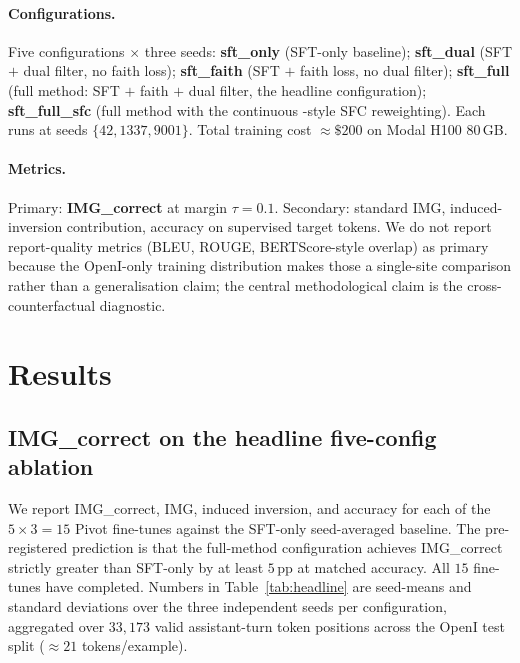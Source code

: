 \documentclass{article}
\begin{document}
\paragraph{Configurations.} Five configurations $\times$ three seeds:
\textbf{sft\_only} (SFT-only baseline); \textbf{sft\_dual} (SFT $+$ dual
filter, no faith loss); \textbf{sft\_faith} (SFT $+$ faith loss, no dual
filter); \textbf{sft\_full} (full method: SFT $+$ faith $+$ dual filter,
the headline configuration); \textbf{sft\_full\_sfc} (full method with the
continuous \citet{li2025sfc}-style SFC reweighting). Each runs at seeds
$\{42, 1337, 9001\}$. Total training cost $\approx \$200$ on Modal H100
80\,GB.

\paragraph{Metrics.} Primary: \textbf{IMG\_correct} at margin $\tau = 0.1$.
Secondary: standard IMG, induced-inversion contribution, accuracy on
supervised target tokens. We do not report report-quality metrics (BLEU,
ROUGE, BERTScore-style overlap) as primary because the OpenI-only training
distribution makes those a single-site comparison rather than a
generalisation claim; the central methodological claim is the cross-
counterfactual diagnostic.

\section{Results}
\label{sec:results}

\subsection{IMG\_correct on the headline five-config ablation}
\label{sec:headline}

We report IMG\_correct, IMG, induced inversion, and accuracy for each of
the $5\times3 = 15$ Pivot fine-tunes against the SFT-only seed-averaged
baseline. The pre-registered prediction is that the full-method
configuration achieves IMG\_correct strictly greater than SFT-only by at
least $5$\,pp at matched accuracy. All $15$ fine-tunes have completed.
Numbers in Table~\ref{tab:headline} are seed-means and standard deviations
over the three independent seeds per configuration, aggregated over
$33{,}173$ valid assistant-turn token positions across the OpenI test
split ($\approx 21$ tokens/example).
\end{document}
